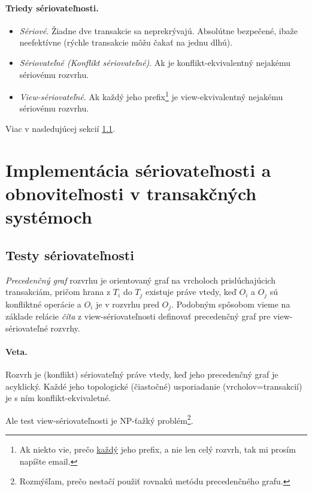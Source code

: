 \documentclass[10pt,a4paper]{article}
\begin{document}
\paragraph{Triedy sériovateľnosti.}
\begin{itemize}
\item \emph{Sériové}. Žiadne dve transakcie sa neprekrývajú. Absolútne bezpečené, ibaže neefektívne (rýchle transakcie môžu čakať na jednu dlhú).
\item \emph{Sériovateľné (Konflikt sériovateľné)}. Ak je konflikt-ekvivalentný nejakému sériovému rozvrhu. 
\item \emph{View-sériovateľné}. Ak každý jeho prefix\footnote{Ak niekto vie, prečo \underline{každý} jeho prefix, a nie len celý rozvrh, tak mi prosím napíšte email.} je view-ekvivalentný nejakému sériovému rozvrhu. 
\end{itemize}

Viac v nasledujúcej sekcií \ref{test_seriovatelnosti}.

    
\section{Implementácia sériovateľnosti a obnoviteľnosti v transakčných systémoch} 
\subsection{Testy sériovateľnosti}
\label{test_seriovatelnosti}

\emph{Precedenčný graf} rozvrhu je orientovaný graf na vrcholoch prislúchajúcich transakciám,
pričom hrana z $T_i$ do $T_j$ existuje práve vtedy, keď $O_i$ a $O_j$ sú konfliktné operácie a $O_i$ je v rozvrhu pred $O_j$.  
Podobným spôsobom vieme na základe relácie \emph{číta} z view-sériovateľnosti definovať precedenčný graf pre view-sériovateľné rozvrhy. 

\paragraph{Veta.} Rozvrh je (konflikt) sériovateľný práve vtedy, keď jeho precedenčný graf je acyklický. Každé jeho topologické (čiastočné) usporiadanie (vrcholov=transakcií) je s ním konflikt-ekvivaletné.  

Ale test view-sériovateľnosti je NP-ťažký problém\footnote{
Rozmýšľam, prečo nestačí použiť rovnakú metódu precedenčného grafu. 
}. 
\end{document}
